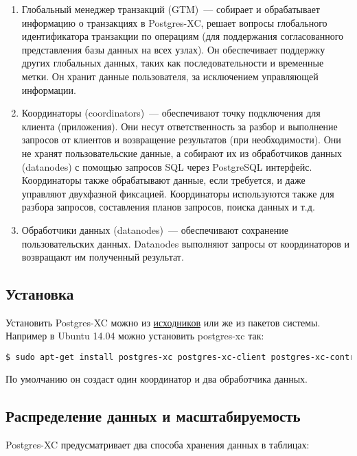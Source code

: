 \begin{enumerate}
  \item Глобальный менеджер транзакций (GTM)~--- собирает и обрабатывает информацию о транзакциях в Postgres-XC, решает вопросы глобального идентификатора транзакции по операциям (для поддержания согласованного представления базы данных на всех узлах). Он обеспечивает поддержку других глобальных данных, таких как последовательности и временные метки. Он хранит данные пользователя, за исключением управляющей информации.
  \item Координаторы (coordinators)~--- обеспечивают точку подключения для клиента (приложения). Они несут ответственность за разбор и выполнение запросов от клиентов и возвращение результатов (при необходимости). Они не хранят пользовательские данные, а собирают их из обработчиков данных (datanodes) с помощью запросов SQL через PostgreSQL интерфейс. Координаторы также обрабатывают данные, если требуется, и даже управляют двухфазной фиксацией. Координаторы используются также для разбора запросов, составления планов запросов, поиска данных и т.д.
  \item Обработчики данных (datanodes)~--- обеспечивают сохранение пользовательских данных. Datanodes выполняют запросы от координаторов и возвращают им полученный результат.
\end{enumerate}

\subsection{Установка}

Установить Postgres-XC можно из \href{http://postgres-xc.sourceforge.net/docs/1_0/install-short.html}{исходников} или же из пакетов системы. Например в Ubuntu 14.04 можно установить postgres-xc так:

\begin{lstlisting}[language=Bash,label=lst:postgres-xc1,caption=Установка Postgres-XC]
$ sudo apt-get install postgres-xc postgres-xc-client postgres-xc-contrib postgres-xc-server-dev
\end{lstlisting}

По умолчанию он создаст один координатор и два обработчика данных.

\subsection{Распределение данных и масштабируемость}

Postgres-XC предусматривает два способа хранения данных в таблицах:

